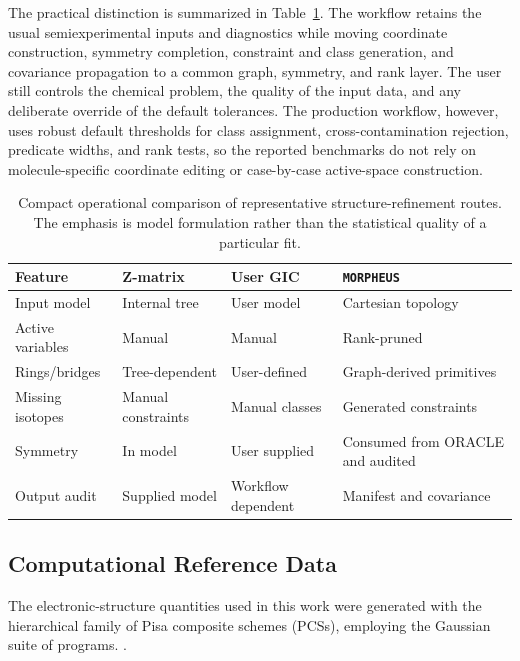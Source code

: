 \documentclass[aip,jcp,reprint,longbibliography,floatfix]{revtex4-2}
\begin{document}
The practical distinction is summarized in Table~\ref{tab:workflow-comparison}.
The workflow retains the usual semiexperimental inputs and diagnostics while
moving coordinate construction, symmetry completion, constraint and class
generation, and covariance propagation to a common graph, symmetry, and rank
layer. The user still controls the chemical problem, the quality of the input
data, and any deliberate override of the default tolerances. The production
workflow, however, uses robust default thresholds for class assignment,
cross-contamination rejection, predicate widths, and rank tests, so the
reported benchmarks do not rely on molecule-specific coordinate editing or
case-by-case active-space construction.

\begin{table}
\caption{Compact operational comparison of representative
structure-refinement routes. The emphasis is model formulation rather than the
statistical quality of a particular fit.}
\label{tab:workflow-comparison}
\footnotesize
\setlength{\tabcolsep}{5pt}
\begin{tabular}{@{}llll@{}}
\toprule
Feature & Z-matrix & User GIC & \texttt{MORPHEUS} \\
\midrule
Input model & Internal tree & User model & Cartesian topology \\
Active variables & Manual & Manual & Rank-pruned \\
Rings/bridges & Tree-dependent & User-defined & Graph-derived primitives \\
Missing isotopes & Manual constraints & Manual classes & Generated constraints \\
Symmetry & In model & User supplied & Consumed from ORACLE and audited \\
Output audit & Supplied model & Workflow dependent & Manifest and covariance \\
\bottomrule
\end{tabular}
\end{table}


\subsection{Computational Reference Data}

The electronic-structure quantities used in this work were generated with the
hierarchical family of Pisa composite schemes (PCSs),\cite{pcs1234_2024,Lazzari2025LCB25} employing the Gaussian suite of programs.
\cite{g16}.
\end{document}
